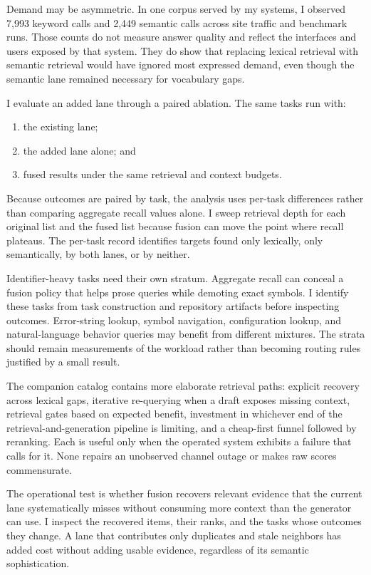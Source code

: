Demand may be asymmetric. In one corpus served by my systems, I observed 7,993 keyword calls and 2,449 semantic calls across site traffic and benchmark runs. Those counts do not measure answer quality and reflect the interfaces and users exposed by that system. They do show that replacing lexical retrieval with semantic retrieval would have ignored most expressed demand, even though the semantic lane remained necessary for vocabulary gaps.

I evaluate an added lane through a paired ablation. The same tasks run with:

\begin{enumerate}
\def\labelenumi{\arabic{enumi}.}
\tightlist
\item
  the existing lane;
\item
  the added lane alone; and
\item
  fused results under the same retrieval and context budgets.
\end{enumerate}

Because outcomes are paired by task, the analysis uses per-task differences rather than comparing aggregate recall values alone. I sweep retrieval depth for each original list and the fused list because fusion can move the point where recall plateaus. The per-task record identifies targets found only lexically, only semantically, by both lanes, or by neither.

Identifier-heavy tasks need their own stratum. Aggregate recall can conceal a fusion policy that helps prose queries while demoting exact symbols. I identify these tasks from task construction and repository artifacts before inspecting outcomes. Error-string lookup, symbol navigation, configuration lookup, and natural-language behavior queries may benefit from different mixtures. The strata should remain measurements of the workload rather than becoming routing rules justified by a small result.

The companion catalog contains more elaborate retrieval paths: explicit recovery across lexical gaps, iterative re-querying when a draft exposes missing context, retrieval gates based on expected benefit, investment in whichever end of the retrieval-and-generation pipeline is limiting, and a cheap-first funnel followed by reranking. Each is useful only when the operated system exhibits a failure that calls for it. None repairs an unobserved channel outage or makes raw scores commensurate.

The operational test is whether fusion recovers relevant evidence that the current lane systematically misses without consuming more context than the generator can use. I inspect the recovered items, their ranks, and the tasks whose outcomes they change. A lane that contributes only duplicates and stale neighbors has added cost without adding usable evidence, regardless of its semantic sophistication.

